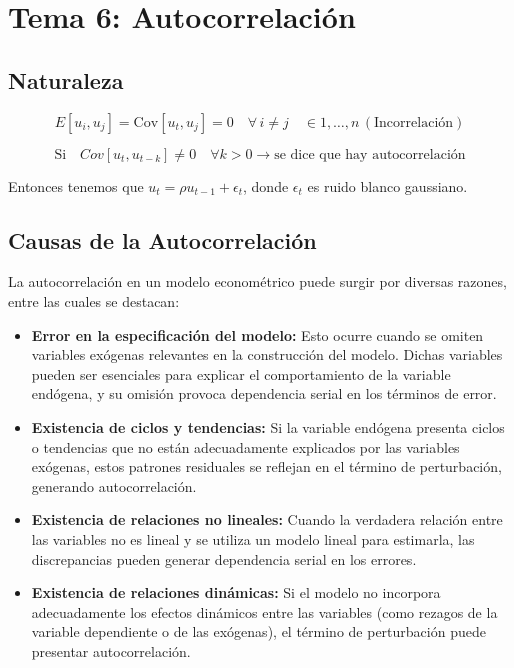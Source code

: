 \documentclass[a4paper,12pt]{article}
\newcommand{\ecuacion}[1]{\ensuremath{#1}}
\begin{document}
\section{Tema 6: Autocorrelación}

\subsection{Naturaleza}


\[
E[u_i,u_j] = \text{Cov}[u_t,u_j] = 0 \quad \forall \, i \neq j \quad \in 1, \ldots, n \, (\text{Incorrelación})
\]

\[
\text{Si} \quad Cov[u_t,u_{t-k}] \neq 0 \quad \forall k > 0 \rightarrow \text{se dice que hay autocorrelación}
\]

Entonces tenemos que \ecuacion{u_t = \rho u_{t-1} + \epsilon_t}, donde \ecuacion{\epsilon_t} es ruido blanco gaussiano.

\subsection{Causas de la Autocorrelación}

La autocorrelación en un modelo econométrico puede surgir por diversas razones, entre las cuales se destacan:

\begin{itemize}
    \item \textbf{Error en la especificación del modelo:}  
    Esto ocurre cuando se omiten variables exógenas relevantes en la construcción del modelo. Dichas variables pueden ser esenciales para explicar el comportamiento de la variable endógena, y su omisión provoca dependencia serial en los términos de error.

    \item \textbf{Existencia de ciclos y tendencias:}  
    Si la variable endógena presenta ciclos o tendencias que no están adecuadamente explicados por las variables exógenas, estos patrones residuales se reflejan en el término de perturbación, generando autocorrelación.

    \item \textbf{Existencia de relaciones no lineales:}  
    Cuando la verdadera relación entre las variables no es lineal y se utiliza un modelo lineal para estimarla, las discrepancias pueden generar dependencia serial en los errores.

    \item \textbf{Existencia de relaciones dinámicas:}  
    Si el modelo no incorpora adecuadamente los efectos dinámicos entre las variables (como rezagos de la variable dependiente o de las exógenas), el término de perturbación puede presentar autocorrelación.
\end{itemize}
\end{document}
